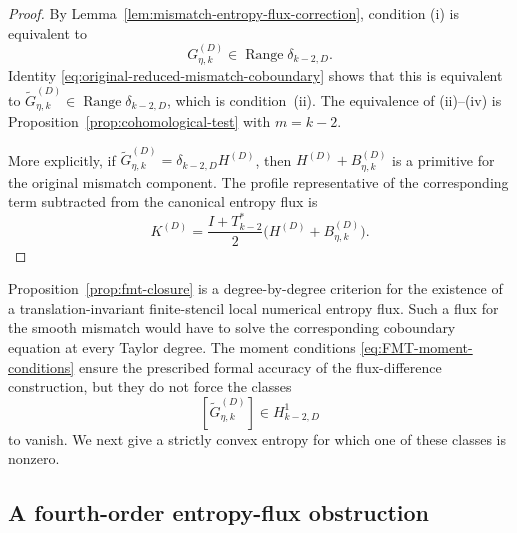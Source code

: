 \documentclass[11pt]{amsart}
\theoremstyle{plain}
\theoremstyle{definition}
\theoremstyle{remark}
\numberwithin{equation}{section}
\theoremstyle{plain}
\begin{document}
\begin{proof}
	By Lemma~\ref{lem:mismatch-entropy-flux-correction}, condition
	\textup{(i)} is equivalent to
	\[
		G_{\eta,k}^{(D)}
		\in\operatorname{Range}\delta_{k-2,D}.
	\]
	Identity \eqref{eq:original-reduced-mismatch-coboundary} shows that this is
	equivalent to
	$\widetilde G_{\eta,k}^{(D)}
	\in\operatorname{Range}\delta_{k-2,D}$, which is condition~\textup{(ii)}.
	The equivalence of \textup{(ii)}--\textup{(iv)} is
	Proposition~\ref{prop:cohomological-test} with $m=k-2$.

	More explicitly, if
	$\widetilde G_{\eta,k}^{(D)}=\delta_{k-2,D}H^{(D)}$, then
	$H^{(D)}+B_{\eta,k}^{(D)}$ is a primitive for the original mismatch
	component.  The profile representative of the corresponding term
	subtracted from the canonical entropy flux is
	\begin{equation}\label{eq:explicit-homogeneous-entropy-flux-correction}
		K^{(D)}
		=
		\frac{I+T_{k-2}^*}{2}
		\bigl(H^{(D)}+B_{\eta,k}^{(D)}\bigr).
	\end{equation}
\end{proof}

Proposition~\ref{prop:fmt-closure} is a degree-by-degree criterion for the
existence of a translation-invariant finite-stencil local numerical entropy
flux.  Such a flux for the smooth mismatch would have to solve the
corresponding coboundary equation at every Taylor degree. 
The moment conditions \eqref{eq:FMT-moment-conditions} ensure the
prescribed formal accuracy of the flux-difference construction, but they do
not force the classes
\[
[\widetilde G_{\eta,k}^{(D)}]\in H^1_{k-2,D}
\]
to vanish.  We next give a strictly convex entropy for which one of these
classes is nonzero.

\subsection{\texorpdfstring{A fourth-order entropy-flux obstruction}{A fourth-order entropy-flux obstruction}}
\label{sec:fourth-order-obstruction}
\end{document}
